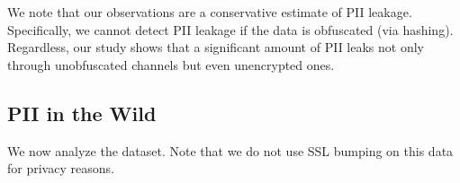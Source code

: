 We note that our observations are a conservative estimate of PII leakage. Specifically, 
we cannot detect PII leakage if the data is obfuscated (\eg via hashing). Regardless, 
our study shows that a significant amount of PII leaks not only through unobfuscated 
channels but even unencrypted ones. 



\subsection{PII in the Wild}

We now
analyze the \mobWild{} dataset. Note that we do not use SSL bumping on this data 
for privacy reasons. 


